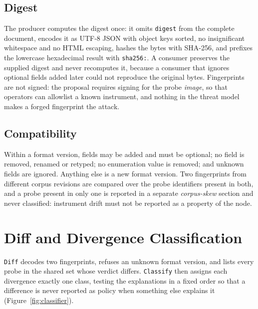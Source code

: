 \subsection{Digest}
The producer computes the digest once: it omits \texttt{digest} from the complete document, encodes it as UTF-8 JSON with object keys sorted, no insignificant whitespace and no HTML escaping, hashes the bytes with SHA-256, and prefixes the lowercase hexadecimal result with \texttt{sha256:}. A consumer preserves the supplied digest and never recomputes it, because a consumer that ignores optional fields added later could not reproduce the original bytes. Fingerprints are not signed: the proposal requires signing for the probe \emph{image}, so that operators can allowlist a known instrument, and nothing in the threat model makes a forged fingerprint the attack.

\subsection{Compatibility}
Within a format version, fields may be added and must be optional; no field is removed, renamed or retyped; no enumeration value is removed; and unknown fields are ignored. Anything else is a new format version. Two fingerprints from different corpus revisions are compared over the probe identifiers present in both, and a probe present in only one is reported in a separate \emph{corpus-skew} section and never classified: instrument drift must not be reported as a property of the node.

\section{Diff and Divergence Classification}
\label{sec:classifier}

\texttt{Diff} decodes two fingerprints, refuses an unknown format version, and lists every probe in the shared set whose verdict differs. \texttt{Classify} then assigns each divergence exactly one class, testing the explanations in a fixed order so that a difference is never reported as policy when something else explains it (Figure~\ref{fig:classifier}).


